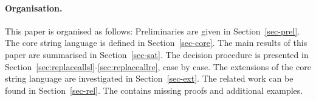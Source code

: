 %


\paragraph{Organisation.} 
This paper is organised as follows: Preliminaries are given in
Section~\ref{sec-prel}. The core string language is defined in
Section~\ref{sec-core}. The main results of this paper are summarised in
Section~\ref{sec-sat}. The decision procedure is presented in
Section~\ref{sec:replaceallsl}-\ref{sec:replaceallre}, case by case. The
extensions of the core string language are investigated in
Section~\ref{sec-ext}. The related work can be found in Section~\ref{sec-rel}.
The  contains missing proofs and additional
examples.
